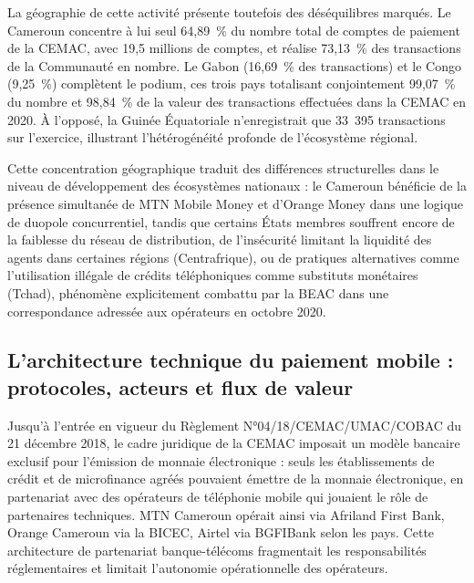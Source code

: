 \documentclass[11pt,a4paper,oneside]{report}
\theoremstyle{definition}
\theoremstyle{remark}
\begin{document}
La géographie de cette activité présente toutefois des déséquilibres marqués. Le Cameroun concentre à lui seul 64,89~\% du nombre total de comptes de paiement de la CEMAC, avec 19,5 millions de comptes, et réalise 73,13~\% des transactions de la Communauté en nombre. Le Gabon (16,69~\% des transactions) et le Congo (9,25~\%) complètent le podium, ces trois pays totalisant conjointement 99,07~\% du nombre et 98,84~\% de la valeur des transactions effectuées dans la CEMAC en 2020. À l'opposé, la Guinée Équatoriale n'enregistrait que 33~395 transactions sur l'exercice, illustrant l'hétérogénéité profonde de l'écosystème régional.

Cette concentration géographique traduit des différences structurelles dans le niveau de développement des écosystèmes nationaux : le Cameroun bénéficie de la présence simultanée de MTN Mobile Money et d'Orange Money dans une logique de duopole concurrentiel, tandis que certains États membres souffrent encore de la faiblesse du réseau de distribution, de l'insécurité limitant la liquidité des agents dans certaines régions (Centrafrique), ou de pratiques alternatives comme l'utilisation illégale de crédits téléphoniques comme substituts monétaires (Tchad), phénomène explicitement combattu par la BEAC dans une correspondance adressée aux opérateurs en octobre 2020.

\subsection{L'architecture technique du paiement mobile : protocoles, acteurs et flux de valeur}

Jusqu'à l'entrée en vigueur du Règlement N°04/18/CEMAC/UMAC/COBAC du 21 décembre 2018, le cadre juridique de la CEMAC imposait un modèle bancaire exclusif pour l'émission de monnaie électronique : seuls les établissements de crédit et de microfinance agréés pouvaient émettre de la monnaie électronique, en partenariat avec des opérateurs de téléphonie mobile qui jouaient le rôle de partenaires techniques. MTN Cameroun opérait ainsi via Afriland First Bank, Orange Cameroun via la BICEC, Airtel via BGFIBank selon les pays. Cette architecture de partenariat banque-télécoms fragmentait les responsabilités réglementaires et limitait l'autonomie opérationnelle des opérateurs.
\end{document}
